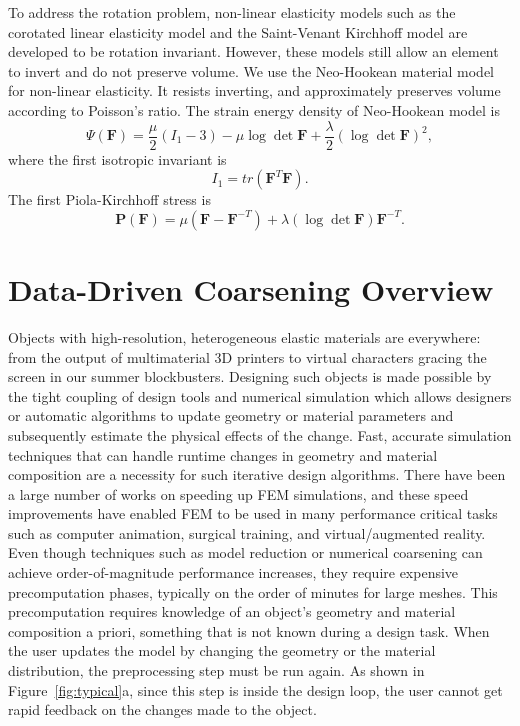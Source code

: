 To address the rotation problem, non-linear elasticity models such as the corotated linear elasticity model and the Saint-Venant Kirchhoff model are developed to be rotation invariant.
However, these models still allow an element to invert and do not preserve volume.
We use the Neo-Hookean material model for non-linear elasticity. It resists inverting, and approximately preserves volume according to Poisson's ratio.
The strain energy density of Neo-Hookean model is
\[
\Psi(\mathbf{F})=\frac{\mu}{2}(I_1-3) - \mu \log \det \mathbf{F} 
+ \frac{\lambda}{2}(\log \det \mathbf{F})^2,
\]
where the first isotropic invariant is 
\[
I_1=tr(\mathbf{F}^T\mathbf{F}).
\]
The first Piola-Kirchhoff stress is
\[
\mathbf{P}(\mathbf{F})=\mu(\mathbf{F}-\mathbf{F}^{-T})+\lambda(\log\det\mathbf{F})\mathbf{F}^{-T}.
\]
\section{Data-Driven Coarsening Overview}
Objects with high-resolution, heterogeneous elastic materials are everywhere:
from the output of multimaterial 3D printers to virtual characters 
gracing the screen in our summer blockbusters.
Designing such objects is made possible by the tight coupling of design
tools and numerical simulation which allows designers or automatic
algorithms to update geometry or material parameters and subsequently
estimate the physical effects of the change.
Fast, accurate simulation techniques that can handle runtime changes in geometry
and material composition are a necessity for such iterative design algorithms.
There have been a large number of works on speeding up FEM simulations,
and these speed improvements have enabled FEM to be used in many performance critical tasks 
such as computer animation, surgical training, and virtual/augmented reality.
Even though techniques such as model reduction or numerical coarsening can
achieve order-of-magnitude performance increases,
they require expensive precomputation phases, typically on the order of minutes for large meshes.
This precomputation requires knowledge of an
object’s geometry and material composition a priori, something
that is not known during a design task.
When the user updates the model by changing the geometry or the material distribution,
the preprocessing step must be run again.
As shown in Figure~\ref{fig:typical}a, since this step is inside the design loop,
the user cannot get rapid feedback on the changes made to the object.
